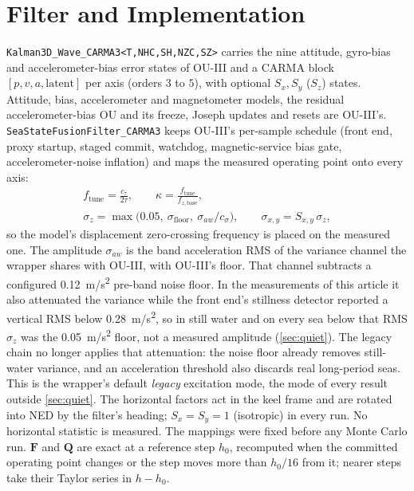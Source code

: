\documentclass[conference]{IEEEtran}
\DeclareRobustCommand{\mat}[1]{\bm{#1}}
\theoremstyle{bodysmall}
\begin{document}
\section{Filter and Implementation}
\label{sec:filter}
\texttt{Kalman3D\_Wave\_CARMA3<T,NHC,SH,NZC,SZ>} carries the nine attitude,
gyro-bias and accelerometer-bias error states of OU-III and a CARMA block
$[p,v,a,\text{latent}]$ per axis (orders $3$ to $5$), with optional
$S_x,S_y$ ($S_z$) states. Attitude, bias, accelerometer and magnetometer
models, the residual accelerometer-bias OU and its freeze, Joseph updates
and resets are OU-III's. \texttt{SeaStateFusionFilter\_CARMA3} keeps
OU-III's per-sample schedule (front end, proxy startup, staged commit,
watchdog, magnetic-service bias gate, accelerometer-noise inflation) and maps
the measured operating point onto every axis:
\begin{gather}
f_{\mathrm{tune}}=\frac{c_\tau}{2\tau},\qquad
\kappa=\frac{f_{\mathrm{tune}}}{f_{z,\mathrm{base}}},\nonumber\\
\sigma_z=\max\!\bigl(0.05,\ \sigma_{\mathrm{floor}},\ \sigma_{aw}/c_\sigma\bigr),
\qquad \sigma_{x,y}=S_{x,y}\,\sigma_z,
\label{eq:mapping}
\end{gather}
so the model's displacement zero-crossing frequency is placed on the
measured one. The amplitude $\sigma_{aw}$ is the band acceleration RMS of the
variance channel the wrapper shares with OU-III, with OU-III's floor. That
channel subtracts a configured \SI{0.12}{m/s^2} pre-band noise floor. In
the measurements of this article it also attenuated the variance while the
front end's stillness detector reported a vertical RMS below
\SI{0.28}{m/s^2}, so in still water and on every sea below that RMS
$\sigma_z$ was the \SI{0.05}{m/s^2} floor, not a measured amplitude
(\cref{sec:quiet}). The legacy chain no longer applies that attenuation:
the noise floor already removes still-water variance, and an acceleration
threshold also discards real long-period seas. This is the wrapper's default \emph{legacy}
excitation mode, the mode of every result outside \cref{sec:quiet}. The
horizontal factors act in the keel frame and are rotated into NED by the
filter's heading; $S_x=S_y=1$ (isotropic) in every run. No horizontal
statistic is measured. The mappings were fixed before any Monte Carlo run.
$\mat{F}$ and $\mat{Q}$ are exact at a reference step $h_0$, recomputed when the committed operating point changes or the step
moves more than $h_0/16$ from it; nearer steps take their Taylor series in
$h-h_0$.
\end{document}
